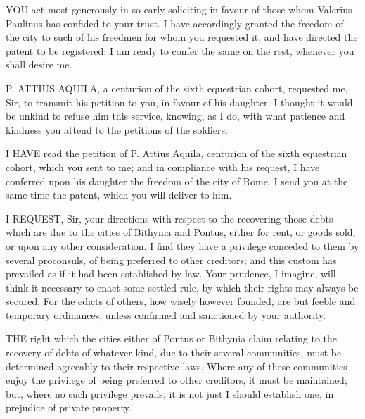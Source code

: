 
YOU act most generously in so early soliciting in favour of those whom
Valerius Paulinus has confided to your trust. I have accordingly granted
the freedom of the city to such of his freedmen for whom you requested it,
and have directed the patent to be registered: I am ready to confer the
same on the rest, whenever you shall desire me.


P. ATTIUS AQUILA, a centurion of the sixth equestrian cohort, requested
me, Sir, to transmit his petition to you, in favour of his daughter. I
thought it would be unkind to refuse him this service, knowing, as I do,
with what patience and kindness you attend to the petitions of the
soldiers.


I HAVE read the petition of P. Attius Aquila, centurion of the sixth
equestrian cohort, which you sent to me; and in compliance with his
request, I have conferred upon his daughter the freedom of the city of
Rome. I send you at the same time the patent, which you will deliver to
him.


I REQUEST, Sir, your directions with respect to the recovering those debts
which are due to the cities of Bithynia and Pontus, either for rent, or
goods sold, or upon any other consideration. I find they have a privilege
conceded to them by several proconsuls, of being preferred to other
creditors; and this custom has prevailed as if it had been established by
law. Your prudence, I imagine, will think it necessary to enact some
settled rule, by which their rights may always be secured. For the edicts
of others, how wisely however founded, are but feeble and temporary
ordinances, unless confirmed and sanctioned by your authority.


THE right which the cities either of Pontus or Bithynia claim relating to
the recovery of debts of whatever kind, due to their several communities,
must be determined agreeably to their respective laws. Where any of these
communities enjoy the privilege of being preferred to other creditors, it
must be maintained; but, where no such privilege prevails, it is not just
I should establish one, in prejudice of private property.


